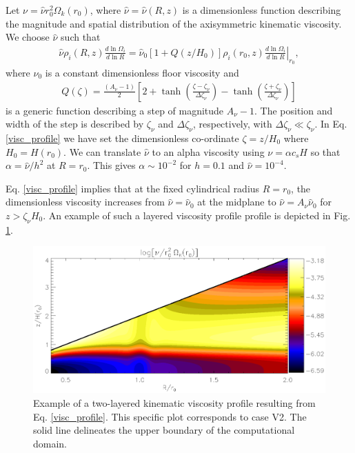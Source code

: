 Let $\nu = \hat{\nu}r_0^2\Omega_k(r_0)$, where
$\hat{\nu}=\hat{\nu}(R,z)$ is a dimensionless function describing
the magnitude and spatial distribution of the axisymmetric kinematic
viscosity. We choose $\hat{\nu}$ such that   
\begin{align}\label{visc_profile}
  \hat{\nu}\rho_i(R,z)\frac{d\ln{\Omega_i}}{d\ln{R}} =
  \hat{\nu}_0\left[1+Q(z/H_0)\right]\rho_i(r_0,z)\left.\frac{d\ln{\Omega_i}}{d\ln{R}}\right|_{r_0}, 
\end{align}
where $\nu_0$ is a constant dimensionless floor viscosity and   
\begin{align}\label{step}
  Q(\zeta) = \frac{\left(A_\nu - 1\right)}{2}
  \left[  2 + \tanh{\left(\frac{\zeta - \zeta_\nu}{\Delta\zeta_\nu}\right)}
    - \tanh{\left(\frac{\zeta +
        \zeta_\nu}{\Delta\zeta_\nu}\right)}\right]
\end{align}
is a generic function describing a step of magnitude
$A_\nu-1$. The position and width of the step is described by
$\zeta_\nu$ and $\Delta\zeta_\nu$, respectively, with $\Delta\zeta_\nu\ll\zeta_\nu$. 
In Eq. \ref{visc_profile} we have set the dimensionless co-ordinate
$\zeta=z/H_0$ where $H_0=H(r_0)$. %
We can translate $\hat{\nu}$ to an alpha viscosity 
using $\nu = \alpha c_s H$ \citep{shakura73} so that $\alpha =
\hat{\nu}/h^2$ at $R=r_0$.  This gives $\alpha\sim 10^{-2}$ for
$h=0.1$ and $\hat{\nu}=10^{-4}$. 

Eq. \ref{visc_profile} implies that at the fixed cylindrical radius
$R=r_0$, the dimensionless viscosity increases from $\hat{\nu} =
\hat{\nu}_0$ at the midplane to $\hat{\nu} = A_\nu\hat{\nu}_0$ for
$z > \zeta_\nu H_0$. An example of such a layered viscosity profile
profile is depicted in Fig. \ref{visc2d}. 
 

\begin{figure}
  \centering
  \includegraphics[width=\linewidth]{figures/pdisk_visc2d_layer2}
  \caption{Example of a two-layered kinematic viscosity profile
    resulting from Eq. \ref{visc_profile}. This specific plot
    corresponds to case V2. The solid line
    delineates the upper boundary of the computational domain.
    \label{visc2d}}
\end{figure}



